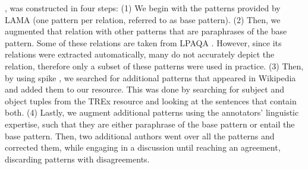 
\resource{}, was constructed in four steps:
(1) We begin with the patterns provided by LAMA \cite{lama} (one pattern per relation, referred to as base pattern). (2) Then, we augmented that relation with other patterns that are paraphrases of the base pattern. Some of these relations are taken from LPAQA \cite{alpaqa}. However, since its relations were extracted automatically, many do not accurately depict the relation, therefore only a subset of these patterns were used in practice. 
(3) Then, by using spike \cite{spike}, we searched for additional patterns that appeared in Wikipedia and added them to our resource. This was done by searching for subject and object tuples from the TREx resource and looking at the sentences that contain both. (4) Lastly, we augment additional patterns using the annotators' linguistic expertise, such that they are either paraphrase of the base pattern or entail the base pattern. 
Then, two additional authors went over all the patterns and corrected them, while engaging in a discussion until reaching an agreement, discarding patterns with disagreements.




